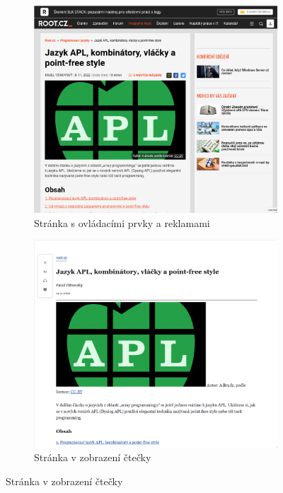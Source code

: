 \documentclass{csbulletin}
\newcommand\program[1]{#1}
\begin{document}
\begin{figure}[htbp]

  \centering
  \caption{Ukázka použití režimu \emph{zobrazení čtečky} v prohlížeči \program{Firefox}}
  \label{fig:readermode}

  \begin{subfigure}[t]{0.45\textwidth}
    \includegraphics[width=\textwidth]{img/root-balast.png}
    \caption{Stránka s ovládacími prvky a reklamami}
  \end{subfigure}
  \hfill
  \begin{subfigure}[t]{0.45\textwidth}
    \includegraphics[width=\textwidth]{img/root-čtečka.png}
    \caption{Stránka v zobrazení čtečky}
  \end{subfigure}
\end{figure}
\end{document}
